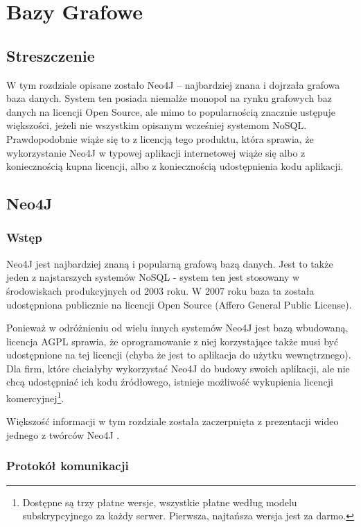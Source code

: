 \chapter{Bazy Grafowe}

\section*{Streszczenie}
W tym rozdziale opisane zostało Neo4J -- najbardziej znana i dojrzała grafowa baza danych.
System ten posiada niemalże monopol na rynku grafowych baz danych na licencji Open Source, ale mimo to popularnością znacznie ustępuje większości, jeżeli nie wszystkim opisanym wcześniej systemom NoSQL.
Prawdopodobnie wiąże się to z licencją tego produktu, która sprawia, że wykorzystanie Neo4J w typowej aplikacji internetowej wiąże się albo z koniecznością kupna licencji, albo z koniecznością udostępnienia kodu aplikacji.

\section{Neo4J}
\label{sec:neo4j}

\subsection*{Wstęp}

Neo4J jest najbardziej znaną i popularną grafową bazą danych.
Jest to także jeden z najstarszych systemów NoSQL - system ten jest stosowany w środowiskach produkcyjnych od 2003 roku.
W 2007 roku baza ta została udostępniona publicznie na licencji Open Source (Affero General Public License).

Ponieważ w odróżnieniu od wielu innych systemów Neo4J jest bazą wbudowaną, licencja AGPL sprawia, że oprogramowanie z niej korzystające także musi być udostępnione na tej licencji (chyba że jest to aplikacja do użytku wewnętrznego).
Dla firm, które chciałyby wykorzystać Neo4J do budowy swoich aplikacji, ale nie chcą udostępniać ich kodu źródłowego, istnieje możliwość wykupienia licencji komercyjnej\footnote{Dostępne są trzy płatne wersje, wszystkie płatne według modelu subskrypcyjnego za każdy serwer. Pierwsza, najtańsza wersja jest za darmo.}.

Większość informacji w tym rozdziale została zaczerpnięta z prezentacji wideo jednego z twórców Neo4J \cite{eifrem-neo4j-talk}.

\subsection*{Protokół komunikacji}

